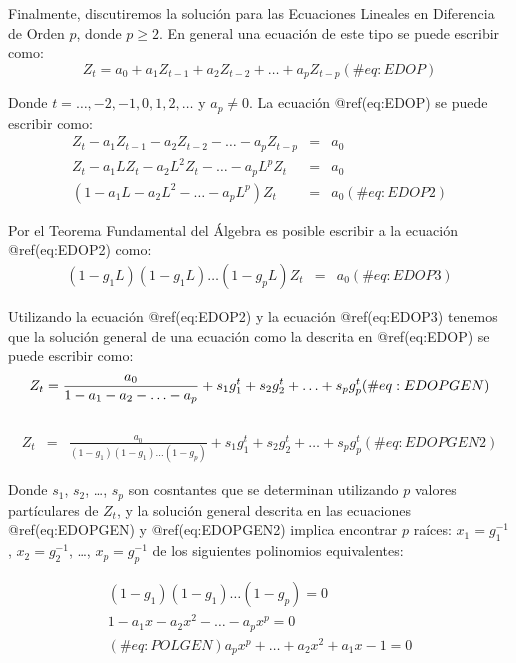 \documentclass[
  a4paper,
]{article}
\begin{document}
Finalmente, discutiremos la solución para las Ecuaciones Lineales en
Diferencia de Orden \(p\), donde \(p \geq 2\). En general una ecuación
de este tipo se puede escribir como: \[
    Z_t = a_0 + a_1 Z_{t-1} + a_2 Z_{t-2} + \ldots + a_p Z_{t-p}
    (\#eq:EDOP)
\]

Donde \(t = \ldots, -2, -1, 0, 1, 2, \ldots\) y \(a_p \neq 0\). La
ecuación @ref(eq:EDOP) se puede escribir como: \begin{eqnarray}
    Z_t - a_1 Z_{t-1} - a_2 Z_{t-2} - \ldots - a_p Z_{t-p} & = & a_0 \nonumber \\
    Z_t - a_1 L Z_t - a_2 L^2 Z_t - \ldots - a_p L^p Z_t & = & a_0 \nonumber \\
    (1 - a_1 L - a_2 L^2 - \ldots - a_p L^p) Z_t & = & a_0
    (\#eq:EDOP2)
\end{eqnarray}

Por el Teorema Fundamental del Álgebra es posible escribir a la ecuación
@ref(eq:EDOP2) como: \begin{eqnarray}
    (1 - g_1 L)(1 - g_1 L) \ldots (1 - g_p L) Z_t & = & a_0
    (\#eq:EDOP3)
\end{eqnarray}

Utilizando la ecuación @ref(eq:EDOP2) y la ecuación @ref(eq:EDOP3)
tenemos que la solución general de una ecuación como la descrita en
@ref(eq:EDOP) se puede escribir como: \[
    Z_t  =  \frac{a_0}{1 - a_1 - a_2 - \ldots - a_p} + s_1 g^t_1 + s_2 g^t_2 + \ldots + s_p g^t_p \\
    (\#eq:EDOPGEN)
\]\\
\begin{eqnarray}
    Z_t & = & \frac{a_0}{(1 - g_1)(1 - g_1) \ldots (1 - g_p)} + s_1 g^t_1 + s_2 g^t_2 + \ldots + s_p g^t_p 
    (\#eq:EDOPGEN2)
\end{eqnarray}

Donde \(s_1\), \(s_2\), \ldots, \(s_p\) son cosntantes que se determinan
utilizando \(p\) valores partículares de \(Z_t\), y la solución general
descrita en las ecuaciones @ref(eq:EDOPGEN) y @ref(eq:EDOPGEN2) implica
encontrar \(p\) raíces: \(x_1 = g^{-1}_1\), \(x_2 = g^{-1}_2\), \ldots,
\(x_p = g^{-1}_p\) de los siguientes polinomios equivalentes:

\begin{eqnarray}
    (1 - g_1)(1 - g_1) \ldots (1 - g_p) = 0 \\
    1 - a_1 x - a_2 x^2 - \ldots - a_p x^p = 0 \\
    (\#eq:POLGEN)
    a_p x^p + \ldots + a_2 x^2 + a_1 x - 1 = 0
\end{eqnarray}
\end{document}
